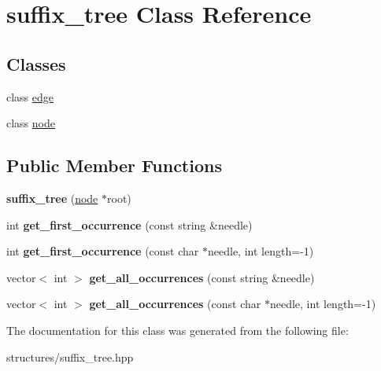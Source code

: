 \hypertarget{classsuffix__tree}{\section{suffix\+\_\+tree Class Reference}
\label{classsuffix__tree}
}
\subsection*{Classes}
\begin{DoxyCompactItemize}
\item 
class \hyperlink{classsuffix__tree_1_1edge}{edge}
\item 
class \hyperlink{classsuffix__tree_1_1node}{node}
\end{DoxyCompactItemize}
\subsection*{Public Member Functions}
\begin{DoxyCompactItemize}
\item 
\hypertarget{classsuffix__tree_acbe8b85bf66af768b42622f58e403c99}{{\bfseries suffix\+\_\+tree} (\hyperlink{classsuffix__tree_1_1node}{node} $\ast$root)}\label{classsuffix__tree_acbe8b85bf66af768b42622f58e403c99}

\item 
\hypertarget{classsuffix__tree_ad196450a7bf1ef5cbaf853093555194f}{int {\bfseries get\+\_\+first\+\_\+occurrence} (const string \&needle)}\label{classsuffix__tree_ad196450a7bf1ef5cbaf853093555194f}

\item 
\hypertarget{classsuffix__tree_aef9a13a219454fbc05eef02c92ad4a33}{int {\bfseries get\+\_\+first\+\_\+occurrence} (const char $\ast$needle, int length=-\/1)}\label{classsuffix__tree_aef9a13a219454fbc05eef02c92ad4a33}

\item 
\hypertarget{classsuffix__tree_a679b725baeb7ca34d9e5e87653ed452e}{vector$<$ int $>$ {\bfseries get\+\_\+all\+\_\+occurrences} (const string \&needle)}\label{classsuffix__tree_a679b725baeb7ca34d9e5e87653ed452e}

\item 
\hypertarget{classsuffix__tree_a82bf896df6938cefbe2a097b685f8821}{vector$<$ int $>$ {\bfseries get\+\_\+all\+\_\+occurrences} (const char $\ast$needle, int length=-\/1)}\label{classsuffix__tree_a82bf896df6938cefbe2a097b685f8821}

\end{DoxyCompactItemize}


The documentation for this class was generated from the following file\+:\begin{DoxyCompactItemize}
\item 
structures/suffix\+\_\+tree.\+hpp\end{DoxyCompactItemize}
